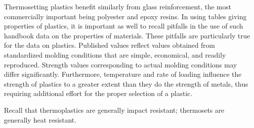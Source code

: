 \documentclass[a4paper,openany,nobib]{tufte-book}
\begin{document}
Thermosetting plastics benefit similarly from glass reinforcement, the
most commercially important being polyester and epoxy resins. In using
tables giving properties of plastics, it is important as well to recall
pitfalls in the use of such handbook data on the properties of
materials. These pitfalls are particularly true for the data on
plastics. Published values reflect values obtained from standardized
molding conditions that are simple, economical, and readily reproduced.
Strength values corresponding to actual molding conditions may differ
significantly. Furthermore, temperature and rate of loading influence
the strength of plastics to a greater extent than they do the strength
of metals, thus requiring additional effort for the proper selection of
a plastic.

Recall that thermoplastics are generally impact resistant; thermosets
are generally heat resistant.
\end{document}
